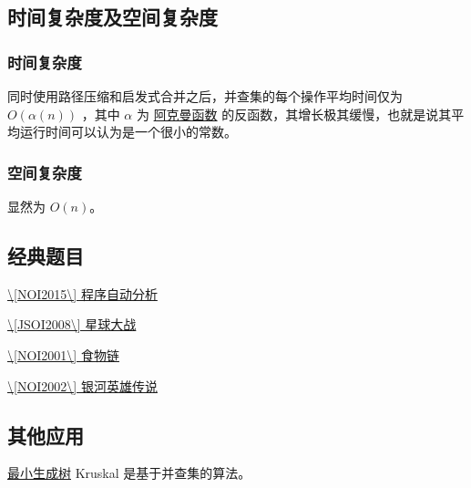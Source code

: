 \subsection{时间复杂度及空间复杂度}

\subsubsection{时间复杂度}

同时使用路径压缩和启发式合并之后，并查集的每个操作平均时间仅为 $O(\alpha(n))$ ，其中 $\alpha$ 为 \href{https://en.wikipedia.org/wiki/Ackermann_function}{阿克曼函数} 的反函数，其增长极其缓慢，也就是说其平均运行时间可以认为是一个很小的常数。 

\subsubsection{空间复杂度}

显然为 $O(n)$。

\subsection{经典题目}

\href{https://www.lydsy.com/JudgeOnline/problem.php?id=4195}{\textbackslash{}[NOI2015\textbackslash{}] 程序自动分析}

\href{https://www.lydsy.com/JudgeOnline/problem.php?id=1015}{\textbackslash{}[JSOI2008\textbackslash{}] 星球大战}

\href{https://www.luogu.org/problemnew/show/P2024}{\textbackslash{}[NOI2001\textbackslash{}] 食物链}

\href{https://www.luogu.org/problemnew/show/P1196}{\textbackslash{}[NOI2002\textbackslash{}] 银河英雄传说}

\subsection{其他应用}

\href{/graph/mst}{最小生成树} Kruskal 是基于并查集的算法。
